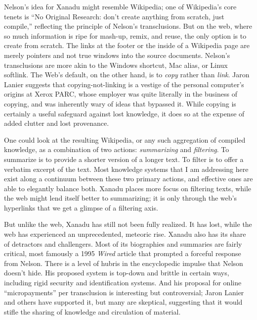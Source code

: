 Nelson's idea for Xanadu might resemble Wikipedia; one of Wikipedia's core tenets is ``No Original Research: don't create anything from scratch, just compile,'' reflecting the principle of Nelson's transclusions.\autocite[11-12]{reagle_good_2010} But on the web, where so much information is ripe for mash-up, remix, and reuse, the only option is to create from scratch. The links at the footer or the inside of a Wikipedia page are merely pointers and not true windows into the source documents. Nelson's transclusions are more akin to the Windows shortcut, Mac alias, or Linux softlink. The Web's default, on the other hand, is to \emph{copy} rather than \emph{link}. Jaron Lanier suggests that copying-not-linking is a vestige of the personal computer's origins at Xerox PARC, whose employer was quite literally in the business of copying, and was inherently wary of ideas that bypassed it.\autocite[221-232]{lanier_who_2013} While copying is certainly a useful safeguard against lost knowledge, it does so at the expense of added clutter and lost provenance.

One could look at the resulting Wikipedia, or any such aggregation of compiled knowledge, as a combination of two actions: \emph{summarizing} and \emph{filtering}. To summarize is to provide a shorter version of a longer text. To filter is to offer a verbatim excerpt of the text. Most knowledge systems that I am addressing here exist along a continuum between these two primary actions, and effective ones are able to elegantly balance both. Xanadu places more focus on filtering texts, while the web might lend itself better to summarizing; it is only through the web's hyperlinks that we get a glimpse of a filtering axis.

But unlike the web, Xanadu has still not been fully realized. It has lost, while the web has experienced an unprecedented, meteoric rise. Xanadu also has its share of detractors and challengers. Most of its biographies and summaries are fairly critical, most famously a 1995 \emph{Wired} article that prompted a forceful response from Nelson.\autocite{wolf_curse_1995} There is a level of hubris in the encyclopedic impulse that Nelson doesn't hide. His proposed system is top-down and brittle in certain ways, including rigid security and identification systems. And his proposal for online ``micropayments'' per transclusion is interesting but controversial; Jaron Lanier and others have supported it, but many are skeptical, suggesting that it would stifle the sharing of knowledge and circulation of material.\autocites{atwood_xanadu_2009}[Chapter 18]{lanier_who_2013}

